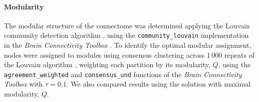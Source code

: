 \documentclass[10pt,letterpaper]{article}
\begin{document}
\paragraph{Modularity}
The modular structure of the connectome was determined applying the Louvain community detection algorithm \cite{Blondel:2008do}, using the \texttt{community\_louvain} implementation in the \emph{Brain Connectivity Toolbox} \cite{Rubinov2010}.
To identify the optimal modular assignment, nodes were assigned to modules using consensus clustering across 1\,000 repeats of the Louvain algorithm \cite{Lancichinetti2012}, weighting each partition by its modularity, $Q$, using the \texttt{agreement\_weighted} and \texttt{consensus\_und} functions of the \emph{Brain Connectivity Toolbox} \cite{Rubinov2010} with $\tau = 0.1$.
We also compared results using the solution with maximal modularity, $Q$.



\end{document}
